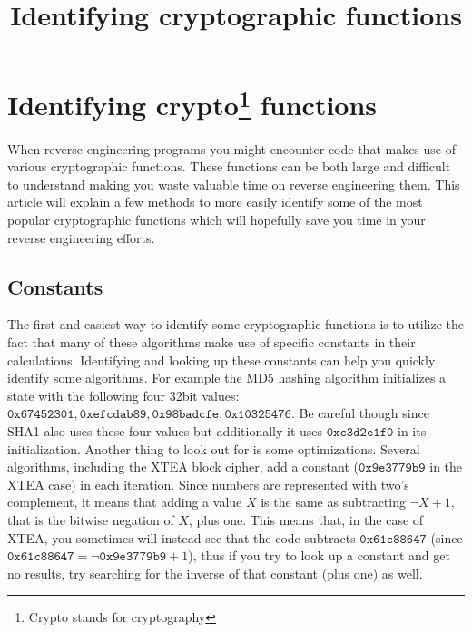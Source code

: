 \documentclass[twocolumn]{article}
\begin{document}
\title{Identifying cryptographic functions}
\date{}
\section*{Identifying crypto\footnote{Crypto stands for cryptography} functions}

When reverse engineering programs you might encounter code that makes use of various cryptographic functions. These functions can be both large and difficult to understand making you waste valuable time on reverse engineering them. This article will explain a few methods to more easily identify some of the most popular cryptographic functions which will hopefully save you time in your reverse engineering efforts.
\vspace*{-1.4\baselineskip}


\subsection*{Constants}
\vspace*{-0.2\baselineskip}

The first and easiest way to identify some cryptographic functions is to utilize the fact that many of these algorithms make use of specific constants in their calculations. Identifying and looking up these constants can help you quickly identify some algorithms. For example the MD5 hashing algorithm initializes a state with the following four 32bit values: $\mathtt{0x67452301, 0xefcdab89, 0x98badcfe, 0x10325476}$. Be careful though since SHA1 also uses these four values but additionally it uses $\mathtt{0xc3d2e1f0}$ in its initialization. Another thing to look out for is some optimizations. Several algorithms, including the XTEA block cipher, add a constant ($\mathtt{0x9e3779b9}$ in the XTEA case) in each iteration. Since numbers are represented with two's complement, it means that adding a value $X$ is the same as subtracting $\lnot X+1$, that is the bitwise negation of $X$, plus one. This means that, in the case of XTEA, you sometimes will instead see that the code subtracts $\mathtt{0x61c88647}$ (since $\mathtt{0x61c88647} =  \lnot\mathtt{0x9e3779b9}+1$), thus if you try to look up a constant and get no results, try searching for the inverse of that constant (plus one) as well.
\vspace*{-0.7\baselineskip}
\end{document}
